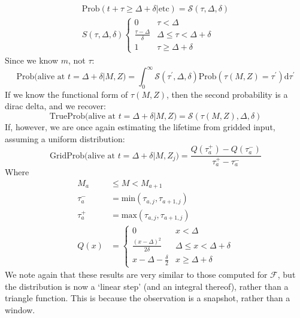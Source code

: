 \documentclass[a4paper,11pt]{article}
\def\d{\mathrm d}
\begin{document}
		\begin{align}
			\text{Prob}\left(t + \tau \geq \Delta + \delta | \text{etc}\right) = \mathcal{S}(\tau,\Delta,\delta)
			\\
			S(\tau,\Delta,\delta)\begin{cases}
				0 & \tau < \Delta
				\\
				\frac{\tau - \Delta}{\delta} & \Delta \leq \tau < \Delta + \delta
				\\
				1 & \tau \geq \Delta + \delta
			\end{cases}
		\end{align}
		Since we know $m$, not $\tau$:
		\begin{equation}
			\text{Prob(alive at }t=\Delta + \delta |M,Z) = \int_0^\infty \mathcal{S}(\tau^\prime,\Delta,\delta) \text{Prob}(\tau(M,Z) = \tau^\prime) \d \tau^\prime
		\end{equation}
		If we know the functional form of $\tau(M,Z)$, then the second probability is a dirac delta, and we recover:
		\begin{equation}
			\text{TrueProb(alive at }t=\Delta + \delta |M,Z) = \mathcal{S}\left(\tau(M,Z),\Delta,\delta\right)
		\end{equation}
		If, however, we are once again estimating the lifetime from gridded input, assuming a uniform distribution:
		\begin{equation}
			\text{GridProb(alive at }t=\Delta + \delta |M,Z_j) = \frac{Q(\tau_a^+) - Q(\tau_a^-)}{\tau_a^+ - \tau_a^-}
		\end{equation}
		Where
		\begin{align}
			M_a &\leq M < M_{a+1}
			\\
			\tau_a^- &= \text{min}(\tau_{a,j},\tau_{a+1,j})
			\\
			\tau_a^+ &= \text{max}(\tau_{a,j},\tau_{a+1,j})
			\\
			Q(x) &= \begin{cases}
			0 & x < \Delta
			\\
			\frac{(x-\Delta)^2}{2\delta} & \Delta \leq x < \Delta + \delta
			\\
			x - \Delta - \frac{\delta}{2} & x \geq \Delta + \delta
			\end{cases}
		\end{align}
		We note again that these results are very similar to those computed for $\mathcal{F}$, but the distribution is now a `linear step' (and an integral thereof), rather than a triangle function. This is because the observation is a snapshot, rather than a window.
\end{document}
